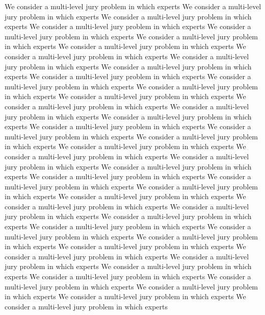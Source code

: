 \documentclass[letterpaper]{article} %
\begin{document}
We consider a multi-level jury problem in which experts
We consider a multi-level jury problem in which experts
We consider a multi-level jury problem in which experts
We consider a multi-level jury problem in which experts
We consider a multi-level jury problem in which experts
We consider a multi-level jury problem in which experts
We consider a multi-level jury problem in which experts
We consider a multi-level jury problem in which experts
We consider a multi-level jury problem in which experts
We consider a multi-level jury problem in which experts
We consider a multi-level jury problem in which experts
We consider a multi-level jury problem in which experts
We consider a multi-level jury problem in which experts
We consider a multi-level jury problem in which experts
We consider a multi-level jury problem in which experts
We consider a multi-level jury problem in which experts
We consider a multi-level jury problem in which experts
We consider a multi-level jury problem in which experts
We consider a multi-level jury problem in which experts
We consider a multi-level jury problem in which experts
We consider a multi-level jury problem in which experts
We consider a multi-level jury problem in which experts
We consider a multi-level jury problem in which experts
We consider a multi-level jury problem in which experts
We consider a multi-level jury problem in which experts
We consider a multi-level jury problem in which experts
We consider a multi-level jury problem in which experts
We consider a multi-level jury problem in which experts
We consider a multi-level jury problem in which experts
We consider a multi-level jury problem in which experts
We consider a multi-level jury problem in which experts
We consider a multi-level jury problem in which experts
We consider a multi-level jury problem in which experts
We consider a multi-level jury problem in which experts
We consider a multi-level jury problem in which experts
We consider a multi-level jury problem in which experts
We consider a multi-level jury problem in which experts
We consider a multi-level jury problem in which experts
We consider a multi-level jury problem in which experts
We consider a multi-level jury problem in which experts
We consider a multi-level jury problem in which experts
We consider a multi-level jury problem in which experts
We consider a multi-level jury problem in which experts
\clearpage

\end{document}
